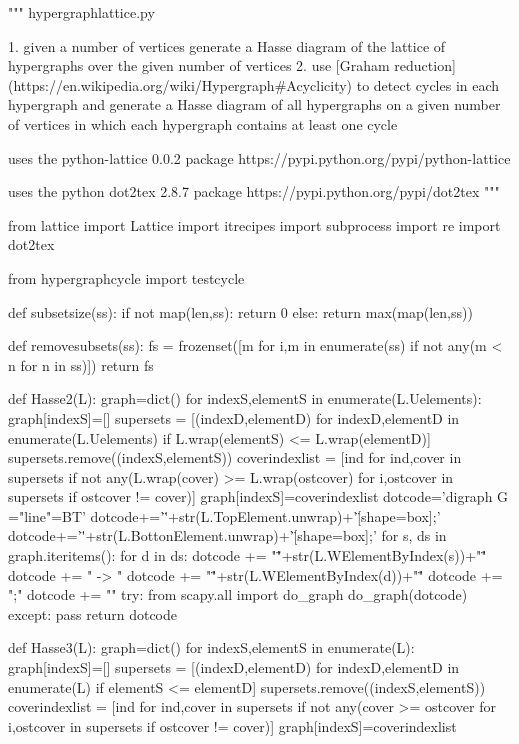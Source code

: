 \begin{python}
"""
hypergraphlattice.py

1. given a number of vertices generate a Hasse diagram
of the lattice of hypergraphs over the given number of vertices
2. use [Graham reduction](https://en.wikipedia.org/wiki/Hypergraph#Acyclicity)
to detect cycles in each hypergraph and generate a Hasse diagram of all
hypergraphs on a given number of vertices in which each hypergraph
contains at least one cycle

uses the python-lattice 0.0.2 package
https://pypi.python.org/pypi/python-lattice

uses the python dot2tex 2.8.7 package
https://pypi.python.org/pypi/dot2tex
"""

from lattice import Lattice
import itrecipes
import subprocess
import re
import dot2tex

from hypergraphcycle import testcycle

def subsetsize(ss):
    if not map(len,ss):
        return 0
    else:
        return max(map(len,ss))

def removesubsets(ss):
    fs = frozenset([m for i,m in enumerate(ss)
                    if not any(m < n for n in ss)])
    return fs

def Hasse2(L):
        graph=dict()
        for indexS,elementS in enumerate(L.Uelements):
            graph[indexS]=[]
            supersets = [(indexD,elementD)
                           for indexD,elementD in enumerate(L.Uelements)
                           if L.wrap(elementS) <= L.wrap(elementD)]
            supersets.remove((indexS,elementS))
            coverindexlist = [ind for ind,cover in supersets
                            if not any(L.wrap(cover) >= L.wrap(ostcover)
                      for i,ostcover in supersets if ostcover != cover)]
            graph[indexS]=coverindexlist
        dotcode='digraph G {\nsplines="line"\nrankdir=BT\n'
        dotcode+='\"'+str(L.TopElement.unwrap)+'\" [shape=box];\n'
        dotcode+='\"'+str(L.BottonElement.unwrap)+'\" [shape=box];\n'
        for s, ds in graph.iteritems():
            for d in ds:
                dotcode += "\""+str(L.WElementByIndex(s))+"\""
                dotcode += " -> "
                dotcode += "\""+str(L.WElementByIndex(d))+"\""
                dotcode += ";\n"
        dotcode += "}"
        try:
            from scapy.all import do_graph
            do_graph(dotcode)
        except:
            pass
        return dotcode

def Hasse3(L):
        graph=dict()
        for indexS,elementS in enumerate(L):
            graph[indexS]=[]
            supersets = [(indexD,elementD)
                           for indexD,elementD in enumerate(L)
                           if elementS <= elementD]
            supersets.remove((indexS,elementS))
            coverindexlist = [ind for ind,cover in supersets
                            if not any(cover >= ostcover
                      for i,ostcover in supersets if ostcover != cover)]
            graph[indexS]=coverindexlist


\end{python}
